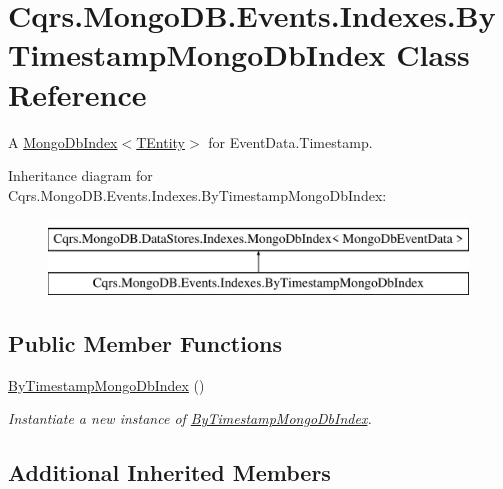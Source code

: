 \hypertarget{classCqrs_1_1MongoDB_1_1Events_1_1Indexes_1_1ByTimestampMongoDbIndex}{}\section{Cqrs.\+Mongo\+D\+B.\+Events.\+Indexes.\+By\+Timestamp\+Mongo\+Db\+Index Class Reference}
\label{classCqrs_1_1MongoDB_1_1Events_1_1Indexes_1_1ByTimestampMongoDbIndex}


A \hyperlink{classCqrs_1_1MongoDB_1_1DataStores_1_1Indexes_1_1MongoDbIndex_a61f4b17dd968f92e81562c70ae062a89_a61f4b17dd968f92e81562c70ae062a89}{Mongo\+Db\+Index$<$\+T\+Entity$>$} for Event\+Data.\+Timestamp.  


Inheritance diagram for Cqrs.\+Mongo\+D\+B.\+Events.\+Indexes.\+By\+Timestamp\+Mongo\+Db\+Index\+:\begin{figure}[H]
\begin{center}
\leavevmode
\includegraphics[height=2.000000cm]{classCqrs_1_1MongoDB_1_1Events_1_1Indexes_1_1ByTimestampMongoDbIndex}
\end{center}
\end{figure}
\subsection*{Public Member Functions}
\begin{DoxyCompactItemize}
\item 
\hyperlink{classCqrs_1_1MongoDB_1_1Events_1_1Indexes_1_1ByTimestampMongoDbIndex_a642c97e253eaa259cb64b627701540c0_a642c97e253eaa259cb64b627701540c0}{By\+Timestamp\+Mongo\+Db\+Index} ()
\begin{DoxyCompactList}\small\item\em Instantiate a new instance of \hyperlink{classCqrs_1_1MongoDB_1_1Events_1_1Indexes_1_1ByTimestampMongoDbIndex}{By\+Timestamp\+Mongo\+Db\+Index}. \end{DoxyCompactList}\end{DoxyCompactItemize}
\subsection*{Additional Inherited Members}


